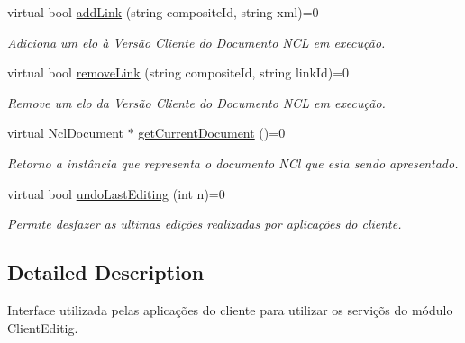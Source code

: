 \begin{DoxyCompactItemize}
virtual bool \hyperlink{classbr_1_1ufscar_1_1lince_1_1ginga_1_1wac_1_1editing_1_1IClientEditing_aa9d2c5d6522cc5428abc2a3231299b74}{addLink} (string compositeId, string xml)=0
\begin{DoxyCompactList}\small\item\em Adiciona um elo à Versão Cliente do Documento NCL em execução. \item\end{DoxyCompactList}\item 
virtual bool \hyperlink{classbr_1_1ufscar_1_1lince_1_1ginga_1_1wac_1_1editing_1_1IClientEditing_a99c3ab683d01ec8fecae2b01f7069bc4}{removeLink} (string compositeId, string linkId)=0
\begin{DoxyCompactList}\small\item\em Remove um elo da Versão Cliente do Documento NCL em execução. \item\end{DoxyCompactList}\item 
virtual NclDocument $\ast$ \hyperlink{classbr_1_1ufscar_1_1lince_1_1ginga_1_1wac_1_1editing_1_1IClientEditing_a72ba6d8611de7d1b8569a5b5d68e4fb9}{getCurrentDocument} ()=0
\begin{DoxyCompactList}\small\item\em Retorno a instância que representa o documento NCl que esta sendo apresentado. \item\end{DoxyCompactList}\item 
virtual bool \hyperlink{classbr_1_1ufscar_1_1lince_1_1ginga_1_1wac_1_1editing_1_1IClientEditing_a8b8cd2e9f79545630e04334d6366e28e}{undoLastEditing} (int n)=0
\begin{DoxyCompactList}\small\item\em Permite desfazer as ultimas edições realizadas por aplicações do cliente. \item\end{DoxyCompactList}\end{DoxyCompactItemize}


\subsection{Detailed Description}
Interface utilizada pelas aplicações do cliente para utilizar os serviçõs do módulo ClientEditig. 

